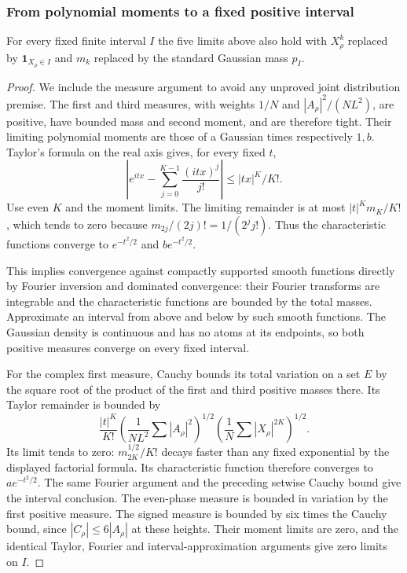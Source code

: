 \subsubsection*{From polynomial moments to a fixed positive interval}

\begin{lemma}
\label{lem:A049-gaussian-interval}
For every fixed finite interval $I$ the five limits above also
hold with $X_\rho^k$ replaced by $\mathbf1_{X_\rho\in I}$
and $m_k$ replaced by the standard Gaussian mass $p_I$.
\end{lemma}

\begin{proof}
We include the measure argument to avoid any unproved joint
distribution premise. The first and third measures, with
weights $1/N$ and $|A_\rho|^2/(NL^2)$, are positive, have
bounded mass and second moment, and are therefore tight.
Their limiting polynomial moments are those of a Gaussian
times respectively $1,b$. Taylor's formula on the real axis
gives, for every fixed $t$,
\[
 \left|e^{itx}-\sum_{j=0}^{K-1}\frac{(itx)^j}{j!}\right|
                                      \le |tx|^K/K!.
\]
Use even $K$ and the moment limits. The limiting remainder
is at most $|t|^Km_K/K!$, which tends to zero because
$m_{2j}/(2j)!=1/(2^j j!)$. Thus the characteristic functions
converge to $e^{-t^2/2}$ and $be^{-t^2/2}$.

This implies convergence against compactly supported smooth
functions directly by Fourier inversion and dominated
convergence: their Fourier transforms are integrable and
the characteristic functions are bounded by the total
masses. Approximate an interval from above and below by
such smooth functions. The Gaussian density is continuous
and has no atoms at its endpoints, so both positive measures
converge on every fixed interval.

For the complex first measure, Cauchy bounds its total
variation on a set $E$ by the square root of the product of
the first and third positive masses there. Its Taylor
remainder is bounded by
\[
 \frac{|t|^K}{K!}
       \left(\frac1{NL^2}\sum|A_\rho|^2\right)^{1/2}
       \left(\frac1N\sum|X_\rho|^{2K}\right)^{1/2}.
\]
Its limit tends to zero: $m_{2K}^{1/2}/K!$ decays faster
than any fixed exponential by the displayed factorial
formula. Its characteristic function therefore converges
to $ae^{-t^2/2}$. The same Fourier argument and the preceding
setwise Cauchy bound give the interval conclusion.
The even-phase measure is bounded in variation by the first
positive measure. The signed measure is bounded by six
times the Cauchy bound, since $|C_\rho|\le6|A_\rho|$ at
these heights. Their moment limits are zero, and the
identical Taylor, Fourier and interval-approximation
arguments give zero limits on $I$.
\end{proof}

